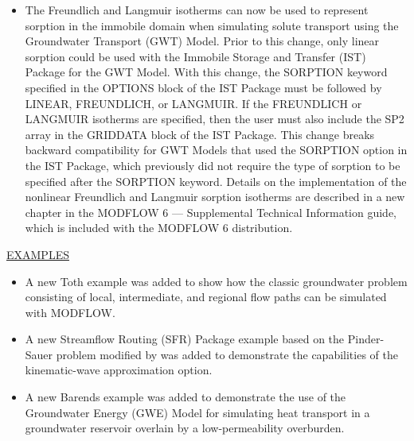 \begin{itemize}
		\item The Freundlich and Langmuir isotherms can now be used to represent sorption in the immobile domain when simulating solute transport using the Groundwater Transport (GWT) Model.  Prior to this change, only linear sorption could be used with the Immobile Storage and Transfer (IST) Package for the GWT Model.  With this change, the SORPTION keyword specified in the OPTIONS block of the IST Package must be followed by LINEAR, FREUNDLICH, or LANGMUIR.  If the FREUNDLICH or LANGMUIR isotherms are specified, then the user must also include the SP2 array in the GRIDDATA block of the IST Package.  This change breaks backward compatibility for GWT Models that used the SORPTION option in the IST Package, which previously did not require the type of sorption to be specified after the SORPTION keyword.  Details on the implementation of the nonlinear Freundlich and Langmuir sorption isotherms are described in a new chapter in the MODFLOW 6 --- Supplemental Technical Information guide, which is included with the MODFLOW 6 distribution.
	\end{itemize}

	\underline{EXAMPLES}
	\begin{itemize}
		\item A new Toth example was added to show how the classic groundwater problem consisting of local, intermediate, and regional flow paths can be simulated with MODFLOW.
		\item A new Streamflow Routing (SFR) Package example based on the Pinder-Sauer problem \citep{pinder1971numerical} modified by \cite{lal2001modification} was added to demonstrate the capabilities of the kinematic-wave approximation option.
		\item A new Barends example was added to demonstrate the use of the Groundwater Energy (GWE) Model for simulating heat transport in a groundwater reservoir overlain by a low-permeability overburden.
	\end{itemize}

